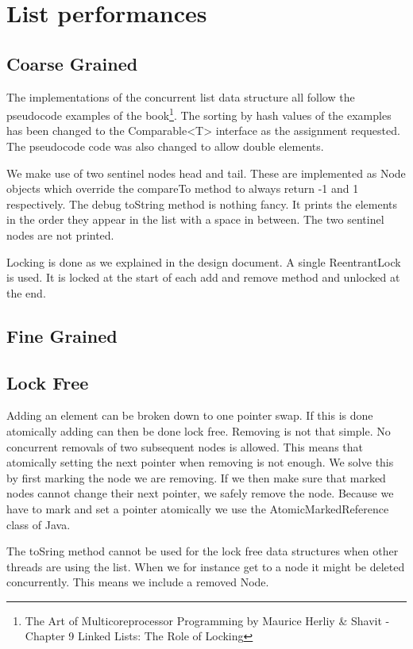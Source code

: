 \documentclass[10pt,a4paper]{article}
\begin{document}
\section{List performances}
\subsection{Coarse Grained}
The implementations of the concurrent list data structure all follow the pseudocode examples of the book\footnote{The Art of Multicoreprocessor Programming by Maurice Herliy \& Shavit - Chapter 9 Linked Lists: The Role of Locking}. The sorting by hash values of the examples has been changed to the Comparable<T> interface as the assignment requested. The pseudocode code was also changed to allow double elements.

We make use of two sentinel nodes head and tail. These are implemented as Node objects which override the compareTo method to always return -1 and 1 respectively. The debug toString method is nothing fancy. It prints the elements in the order they appear in the list with a space in between. The two sentinel nodes are not printed.

Locking is done as we explained in the design document. A single ReentrantLock is used. It is locked at the start of each add and remove method and unlocked at the end.

\subsection{Fine Grained}

\subsection{Lock Free}
Adding an element can be broken down to one pointer swap. If this is done atomically adding can then be done lock free. Removing is not that simple. No concurrent removals of two subsequent nodes is allowed. This means that atomically setting the next pointer when removing is not enough. We solve this by first marking the node we are removing. If we then make sure that marked nodes cannot change their next pointer, we safely remove the node. Because we have to mark and set a pointer atomically we use the AtomicMarkedReference class of Java.

The toSring method cannot be used for the lock free data structures when other threads are using the list. When we for instance get to a node it might be deleted concurrently. This means we include a removed Node.
\end{document}

